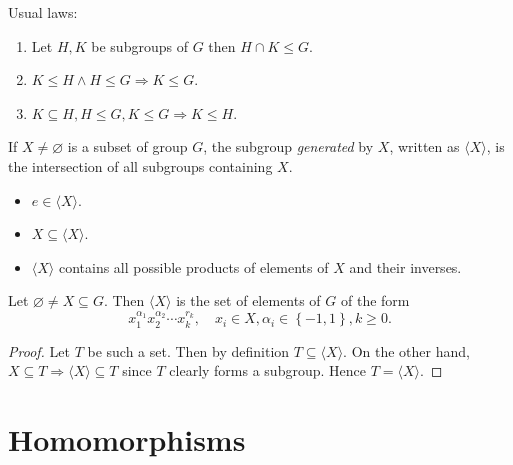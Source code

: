 \documentclass[10pt]{article}
\def\le{\leqslant}
\def\ge{\geqslant}
\begin{document}
    Usual laws:
    \begin{proposition}\label{prop:comparing_groups}
        \begin{enumerate}[(1)]
            \item Let $ H,K $ be subgroups of $G$ then $ H\cap K\le G $.
            \item $ K\le H \land H\le G \Rightarrow K\le G $.
            \item $ K \subseteq H, H\le G, K\le G \Rightarrow K\le H $.
        \end{enumerate}
    \end{proposition}
    \begin{definition}
        If $ X\neq \varnothing $ is a subset of group $G$, the subgroup \textit{generated} by $X$, written as $ \langle X \rangle $, is the intersection of all subgroups containing $X$.
    \end{definition}
    \begin{remark}
        \begin{itemize}
            \item $ e\in \langle X \rangle $.
            \item $ X \subseteq \langle X \rangle $.
            \item $ \langle X \rangle $ contains all possible products of elements of $X$ and their inverses.
        \end{itemize}
    \end{remark}
    \begin{proposition}\label{prop:generation_of_groups}
        Let $ \varnothing \neq X \subseteq G $. Then $ \langle X \rangle $ is the set of elements of $ G $ of the form
        \[
            x_1^{\alpha_1}x_2^{\alpha_2}\cdots x_k^{r_k},\quad x_i\in X, \alpha_i\in \left\{ -1,1\right\}, k\ge 0
        .\]
    \end{proposition}
    \begin{proof}
        Let $T$ be such a set. Then by definition $ T \subseteq \langle X \rangle $. On the other hand, $ X \subseteq T \Rightarrow \langle X \rangle  \subseteq T$ since $T$ clearly forms a subgroup. Hence $ T=\langle X \rangle $.
    \end{proof}
    \section{Homomorphisms}
\end{document}
